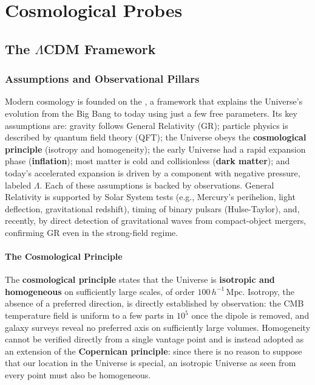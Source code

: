 \chapter{Cosmological Probes} \label{ch:cosmo_probes}

\section{The $\Lambda$CDM Framework} \label{sec:lcdm}

\subsection{Assumptions and Observational Pillars} \label{subsec:lcdm_assumptions}

Modern cosmology is founded on the , a framework that explains the Universe's evolution from the Big Bang to today using just a few free parameters. Its key assumptions are: gravity follows General Relativity (GR); particle physics is described by quantum field theory (QFT); the Universe obeys the \textbf{cosmological principle} (isotropy and homogeneity); the early Universe had a rapid expansion phase (\textbf{inflation}); most matter is cold and collisionless (\textbf{dark matter}); and today's accelerated expansion is driven by a component with negative pressure, labeled $\Lambda$. Each of these assumptions is backed by observations. General Relativity is supported by Solar System tests (e.g., Mercury's perihelion, light deflection, gravitational redshift), timing of binary pulsars (Hulse-Taylor), and, recently, by direct detection of gravitational waves from compact-object mergers, confirming GR even in the strong-field regime.

\subsubsection{The Cosmological Principle} \label{subsubsec:cosmo_principle}

The \textbf{cosmological principle} states that the Universe is \textbf{isotropic and homogeneous} on sufficiently large scales, of order $100\,h^{-1}\,\text{Mpc}$. Isotropy, the absence of a preferred direction, is directly established by observation: the CMB temperature field is uniform to a few parts in $10^5$ once the dipole is removed, and galaxy surveys reveal no preferred axis on sufficiently large volumes. Homogeneity cannot be verified directly from a single vantage point and is instead adopted as an extension of the \textbf{Copernican principle}: since there is no reason to suppose that our location in the Universe is special, an isotropic Universe as seen from every point must also be homogeneous.

